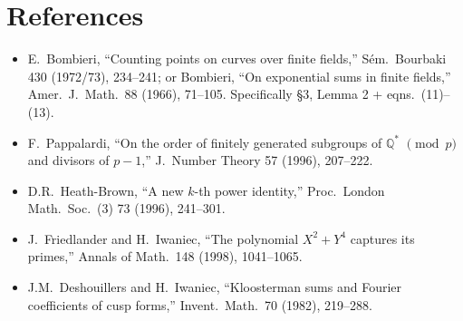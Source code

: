\documentclass[12pt]{amsart}
\theoremstyle{definition}
\theoremstyle{remark}
\begin{document}
\section*{References}

\begin{itemize}
\item[{[B73]}] E.\ Bombieri, ``Counting points on curves over finite fields,''
  S\'em.\ Bourbaki 430 (1972/73), 234--241; or
  Bombieri, ``On exponential sums in finite fields,'' Amer.\ J.\ Math.\ 88
  (1966), 71--105. Specifically \S3, Lemma 2 + eqns.\ (11)--(13).
\item[{[P96]}] F.\ Pappalardi, ``On the order of finitely generated
  subgroups of $\mathbb{Q}^*$ $\pmod p$ and divisors of $p - 1$,''
  J.\ Number Theory 57 (1996), 207--222.
\item[{[HB96]}] D.R.\ Heath-Brown, ``A new $k$-th power identity,''
  Proc.\ London Math.\ Soc.\ (3) 73 (1996), 241--301.
\item[{[FI98]}] J.\ Friedlander and H.\ Iwaniec, ``The polynomial
  $X^2 + Y^4$ captures its primes,'' Annals of Math.\ 148 (1998), 1041--1065.
\item[{[DI82]}] J.M.\ Deshouillers and H.\ Iwaniec, ``Kloosterman sums and
  Fourier coefficients of cusp forms,'' Invent.\ Math.\ 70 (1982), 219--288.
\end{itemize}
\end{document}
